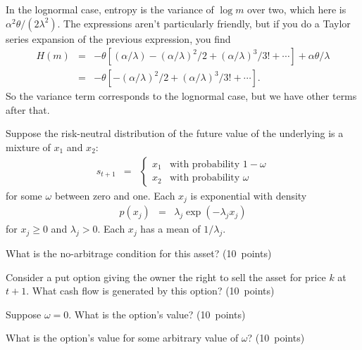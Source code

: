\documentclass[11pt]{exam}
\begin{document}
\begin{questions}
\begin{solution}
\begin{parts}
\item In the lognormal case, entropy is the variance of $\log m$ over two,
which here is $ \alpha^2 \theta /(2 \lambda^2)$.
The expressions aren't particularly friendly,
but if you do a Taylor series expansion of the previous
expression, you find
\begin{eqnarray*}
    H(m) &=& - \theta \left[ (\alpha/\lambda) - (\alpha/\lambda)^2/2
        + (\alpha/\lambda)^3/3! + \cdots \right]
        + \alpha \theta/\lambda \\
        &=& - \theta \left[ - (\alpha/\lambda)^2/2
        + (\alpha/\lambda)^3/3! + \cdots \right] .
\end{eqnarray*}
So the variance term corresponds to the lognormal case,
but we have other terms after that.
\end{parts}
\end{solution}

Suppose the risk-neutral distribution of the future value of the underlying
is a mixture of $x_1$ and $x_2$:
\begin{eqnarray*}
    s_{t+1} &=&
        \left\{
        \begin{array}{ll}
            x_1 & \mbox{with probability } 1-\omega \\
            x_2 & \mbox{with probability } \omega
        \end{array}
        \right.
\end{eqnarray*}
for some $\omega$ between zero and one.
Each $x_j$ is exponential with density
\begin{eqnarray*}
    p(x_j) &=& \lambda_j \exp(-\lambda_j x_j)
\end{eqnarray*}
for $x_j \geq 0$ and $\lambda_j > 0$.
Each $x_j$ has a mean of $1/\lambda_j$.

\begin{parts}
\item What is the no-arbitrage condition for this asset?
(10~points)
\item Consider a put option giving the owner the right to sell
the asset for price $k$ at $t+1$.
What cash flow is generated by this option?
(10~points)
\item Suppose $\omega = 0$.
What is the option's value?
(10~points)
\item What is the option's value for some arbitrary value of $\omega$?
(10~points)
\end{parts}


\end{questions}
\end{document}

